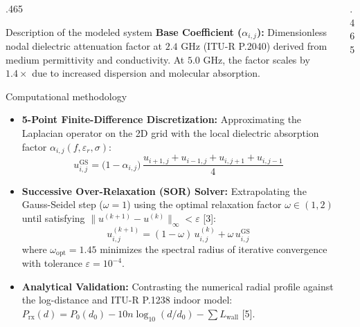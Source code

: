 \documentclass[final]{beamer}
\begin{document}
\begin{frame}[t]
\begin{columns}[t]
\begin{column}{.465\paperwidth}
\begin{block}{Description of the modeled system}
					\vspace{0.15cm}
					\textbf{Base Coefficient (\(\alpha_{i,j}\)):} Dimensionless nodal dielectric attenuation factor at \(2.4\text{ GHz}\) (ITU-R P.2040) derived from medium permittivity and conductivity. At \(5.0\text{ GHz}\), the factor scales by \(1.4\times\) due to increased dispersion and molecular absorption.
				\end{block}
				
				\begin{block}{Computational methodology}
					\begin{itemize}
						\item \textbf{5-Point Finite-Difference Discretization:} Approximating the Laplacian operator on the 2D grid with the local dielectric absorption factor \(\alpha_{i,j}(f, \varepsilon_r, \sigma)\):
						\begin{equation}
							u_{i,j}^{\text{GS}} = \big(1 - \alpha_{i,j}\big)\,\frac{u_{i+1,j} + u_{i-1,j} + u_{i,j+1} + u_{i,j-1}}{4}
						\end{equation}
						\item \textbf{Successive Over-Relaxation (SOR) Solver:} Extrapolating the Gauss-Seidel step (\(\omega = 1\)) using the optimal relaxation factor \(\omega \in (1, 2)\) until satisfying \(\|u^{(k+1)} - u^{(k)}\|_\infty < \varepsilon\) [3]:
						\begin{equation}
							u_{i,j}^{(k+1)} = (1 - \omega)\,u_{i,j}^{(k)} + \omega\,u_{i,j}^{\text{GS}}
						\end{equation}
						where \(\omega_{\text{opt}} = 1.45\) minimizes the spectral radius of iterative convergence with tolerance \(\varepsilon = 10^{-4}\).
						\item \textbf{Analytical Validation:} Contrasting the numerical radial profile against the log-distance and ITU-R P.1238 indoor model: \(P_{\text{rx}}(d) = P_0(d_0) - 10n\log_{10}(d/d_0) - \sum L_{\text{wall}}\) [5].
					\end{itemize}
				\end{block}
				
			\end{column}
			
			\hfill
			
			\begin{column}{.465\paperwidth}
				

\end{column}
\end{columns}
\end{frame}
\end{document}

